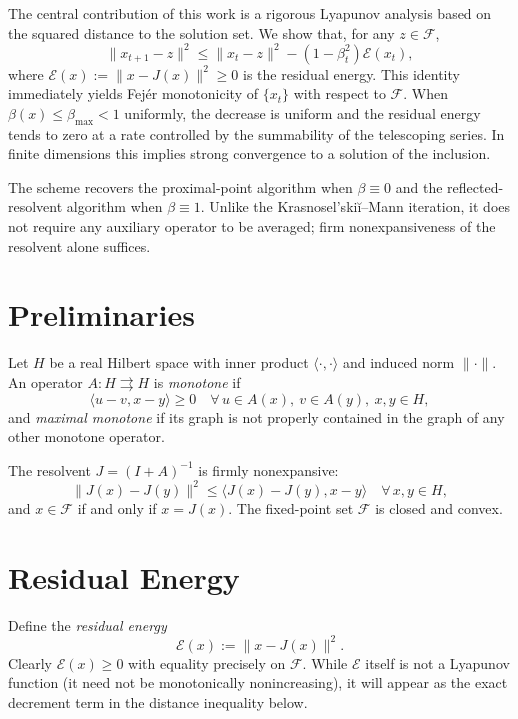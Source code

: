 \documentclass{article}
\begin{document}
The central contribution of this work is a rigorous Lyapunov analysis based on the squared distance to the solution set. We show that, for any \(z \in \mathcal{F}\),
\[
\|x_{t+1} - z\|^2 \le \|x_t - z\|^2 - (1 - \beta_t^2) \mathcal{E}(x_t),
\]
where \(\mathcal{E}(x) := \|x - J(x)\|^2 \ge 0\) is the residual energy. This identity immediately yields Fejér monotonicity of \(\{x_t\}\) with respect to \(\mathcal{F}\). When \(\beta(x) \le \beta_{\max} < 1\) uniformly, the decrease is uniform and the residual energy tends to zero at a rate controlled by the summability of the telescoping series. In finite dimensions this implies strong convergence to a solution of the inclusion.

The scheme recovers the proximal-point algorithm when \(\beta \equiv 0\) and the reflected-resolvent algorithm when \(\beta \equiv 1\). Unlike the Krasnosel'ski\u{i}--Mann iteration, it does not require any auxiliary operator to be averaged; firm nonexpansiveness of the resolvent alone suffices.

\section{Preliminaries}

Let \(H\) be a real Hilbert space with inner product \(\langle \cdot, \cdot \rangle\) and induced norm \(\|\cdot\|\). An operator \(A: H \rightrightarrows H\) is \emph{monotone} if
\[
\langle u - v, x - y \rangle \ge 0 \quad \forall\, u \in A(x),\ v \in A(y),\ x,y \in H,
\]
and \emph{maximal monotone} if its graph is not properly contained in the graph of any other monotone operator.

The resolvent \(J = (I + A)^{-1}\) is firmly nonexpansive:
\[
\|J(x) - J(y)\|^2 \le \langle J(x) - J(y), x - y \rangle \quad \forall\, x,y \in H,
\]
and \(x \in \mathcal{F}\) if and only if \(x = J(x)\). The fixed-point set \(\mathcal{F}\) is closed and convex.

\section{Residual Energy}

Define the \emph{residual energy}
\[
\mathcal{E}(x) := \|x - J(x)\|^2.
\]
Clearly \(\mathcal{E}(x) \ge 0\) with equality precisely on \(\mathcal{F}\). While \(\mathcal{E}\) itself is not a Lyapunov function (it need not be monotonically nonincreasing), it will appear as the exact decrement term in the distance inequality below.
\end{document}
